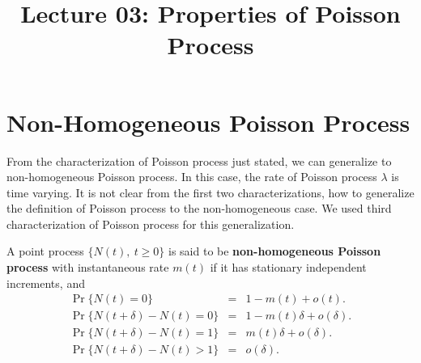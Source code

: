 \documentclass[a4paper,10pt,english]{article}
\title{Lecture 03: Properties of Poisson Process}
\author{}
\begin{document}
\maketitle
\section{Non-Homogeneous Poisson Process}
From the characterization of Poisson process just stated, we can generalize to non-homogeneous Poisson process. In this case, the rate of Poisson process $\lambda$ is time varying. It is not clear from the first two characterizations, how to generalize the definition of Poisson process to the non-homogeneous case. We used third characterization of Poisson process for this generalization. 

\begin{defn}\label{defn:NonHomogeneousPoisson} A point process $\{N(t),~t\geqslant 0\}$ is said to be \textbf{non-homogeneous Poisson process} with instantaneous rate $m(t)$ if it has stationary independent increments, and 
 \begin{eqnarray*}\label{eq:NonHomogeneousPoisson}
 \Pr\{N(t)=0\}&=&1-m(t)+o(t). \\
  \Pr\{N(t+\delta)-N(t)=0\} &=& 1-m(t)\delta+o(\delta). \\
   \Pr\{N(t+\delta)-N(t)=1\} &=& m(t)\delta+o(\delta). \\
   \Pr\{N(t+\delta)-N(t)>1\} &=& o(\delta). \\
   \end{eqnarray*}
\end{defn}
\end{document}
